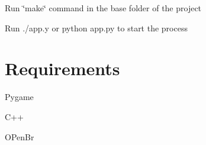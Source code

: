 Run \char`\"{}make\char`\"{} command in the base folder of the project

Run ./app.y or python app.\-py to start the process

\section*{Requirements}

Pygame

C++

O\-Pen\-Br 